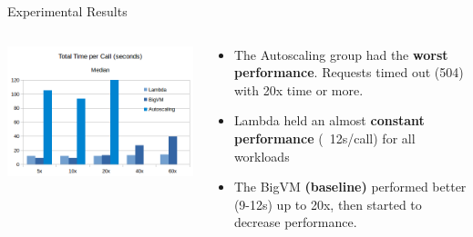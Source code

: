 \documentclass[pdf,10pt]{beamer}
\begin{document}
\begin{frame}{Experimental Results}
    \begin{columns}[T]
        \begin{column}{0.57\textwidth}
            \vskip1.4cm
            \includegraphics[width=\textwidth]{img/1.png}
        \end{column}
        \begin{column}{0.5\textwidth}
            \begin{itemize}
                \item The Autoscaling group had the \textbf{worst performance}. Requests timed out (504) with 20x time or more.
\item Lambda held an almost \textbf{constant performance} (~12s/call) for all workloads
\item The BigVM \textbf{(baseline)} performed better (9-12s) up to 20x, then started to decrease performance.
            \end{itemize}
        \end{column}
    \end{columns}
\end{frame}
\end{document}
